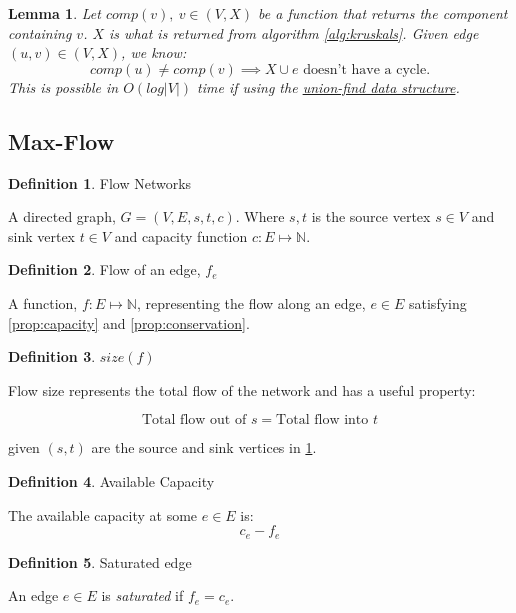 \documentclass{article}
\newtheorem{lemma}[theorem]{Lemma}
\theoremstyle{definition}
\newtheorem{definition}{Definition}[section]
\begin{document}
\begin{lemma}
	Let $comp(v), \: v \in (V,X)$ be a function that returns the component containing $v$. $X$ is what is returned from algorithm \ref{alg:kruskals}. Given edge $(u,v) \in (V,X)$, we know:
	$$comp(u) \neq comp(v) \implies X \cup e \text{ doesn't have a cycle.}$$
	This is possible in $O(log|V|)$ time if using the \href{https://en.wikipedia.org/wiki/Disjoint-set_data_structure}{union-find data structure}.
\end{lemma}

\subsection{Max-Flow}
\begin{definition}{Flow Networks}
\label{def:flow_networks}

A directed graph, $G = (V, E, s, t, c)$. Where $s, t$ is the source vertex $s \in V$ and sink vertex $t \in V$ and capacity function $c:E \mapsto \mathbb{N}$.
\end{definition}


\begin{definition}{Flow of an edge, $f_e$}
\label{prop:flow_edge}
	
A function, $f:E \mapsto \mathbb{N}$, representing the flow along an edge, $e \in E$ satisfying \ref{prop:capacity} and \ref{prop:conservation}.
\end{definition}

\begin{definition}{$size(f)$}
\label{prop:size}
	
Flow size represents the total flow of the network and has a useful property:
	
$$\text{Total flow out of } s = \text{Total flow into } t$$
	
given $(s, t)$ are the source and sink vertices in \ref{def:flow_networks}.
\end{definition}

\begin{definition}{Available Capacity}
\label{def:available_cap}

The available capacity at some $e \in E$ is:
$$c_e - f_e$$
\end{definition}

\begin{definition}{Saturated edge}
\label{def:sat_edge}

An edge $e \in E$ is \textit{saturated} if $f_e = c_e$.
\end{definition}
\end{document}
